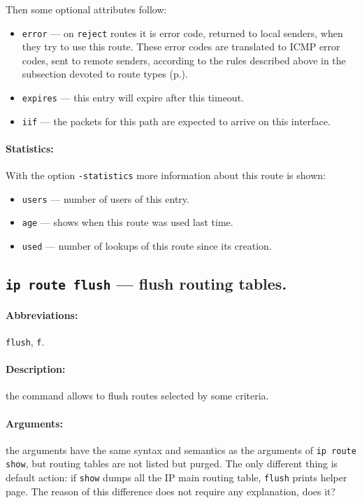 Then some optional attributes follow:
\begin{itemize}
\item \verb|error| --- on \verb|reject| routes it is error code,
returned to local senders, when they try to use this route.
These error codes are translated to ICMP error codes, sent to remote
senders, according to the rules described above in the subsection
devoted to route types (p.\pageref{IP-ROUTE-TYPES}).
\label{IP-ROUTE-GET-error}

\item \verb|expires| --- this entry will expire after this timeout.

\item \verb|iif| --- the packets for this path are expected to arrive
on this interface.
\end{itemize}

\paragraph{Statistics:} With the option \verb|-statistics| more
information about this route is shown:
\begin{itemize}
\item \verb|users| --- number of users of this entry.
\item \verb|age| --- shows when this route was used last time.
\item \verb|used| --- number of lookups of this route since its creation.
\end{itemize}


\subsection{{\tt ip route flush} --- flush routing tables.}
\label{IP-ROUTE-FLUSH}

\paragraph{Abbreviations:} \verb|flush|, \verb|f|.

\paragraph{Description:} the command allows to flush routes selected
by some criteria.

\paragraph{Arguments:} the arguments have the same syntax and semantics
as the arguments of \verb|ip route show|, but routing tables are not
listed but purged. The only different thing is default action: if \verb|show|
dumps all the IP main routing table, \verb|flush| prints helper page.
The reason of this difference does not require any explanation, does it?



